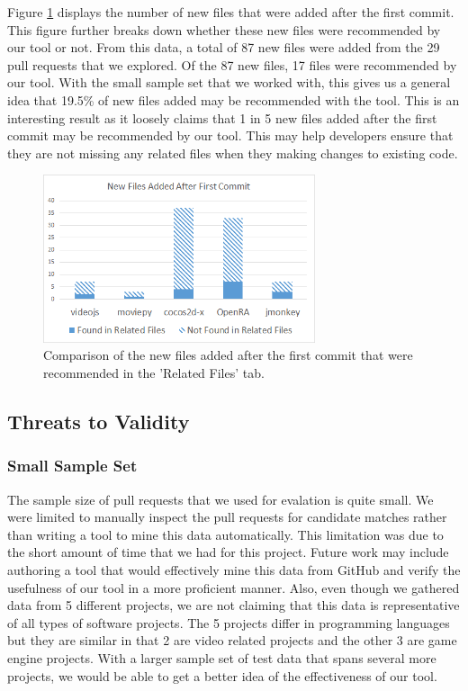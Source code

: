 Figure \ref{fig:newFilesAfterFirstCommit} displays the number of new files that were added after the first commit. This figure further breaks down whether these new files were recommended by our tool or not. From this data, a total of 87 new files were added from the 29 pull requests that we explored. Of the 87 new files, 17 files were recommended by our tool. With the small sample set that we worked with, this gives us a general idea that 19.5\% of new files added may be recommended with the tool. This is an interesting result as it loosely claims that 1 in 5 new files added after the first commit may be recommended by our tool. This may help developers ensure that they are not missing any related files when they making changes to existing code.

\begin{figure}[h!]
\includegraphics[width=8cm]{NewFilesAfterFirstCommit}
\caption{Comparison of the new files added after the first commit that were recommended in the 'Related Files' tab.}
\label{fig:newFilesAfterFirstCommit}
\end{figure}

\subsection{Threats to Validity}

\subsubsection{Small Sample Set}

The sample size of pull requests that we used for evalation is quite small. We were limited to manually inspect the pull requests for candidate matches rather than writing a tool to mine this data automatically. This limitation was due to the short amount of time that we had for this project. Future work may include authoring a tool that would effectively mine this data from GitHub and verify the usefulness of our tool in a more proficient manner. Also, even though we gathered data from 5 different projects, we are not claiming that this data is representative of all types of software projects. The 5 projects differ in programming languages but they are similar in that 2 are video related projects and the other 3 are game engine projects. With a larger sample set of test data that spans several more projects, we would be able to get a better idea of the effectiveness of our tool.

